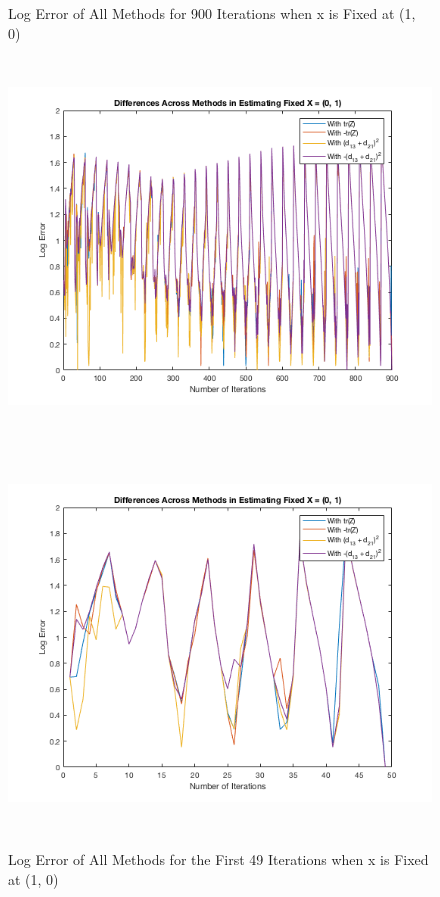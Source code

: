 \documentclass[answers]{exam}
\begin{document}
    \begin{figure}[H]
    \centering
    
    \caption{Log Error of All Methods for 900 Iterations when x is Fixed at (1, 0)}
    \includegraphics[width=\linewidth, height = 10cm]{Problem8harmc.png}
    \label{le900c}
    \caption{Log Error of All Methods for the First 49 Iterations when x is Fixed at (1, 0)}
    \includegraphics[width=\linewidth, height = 10cm]{Problem8prioc.png}
    \label{le49c}
    \end{figure} 
    

    
    
\end{document}
